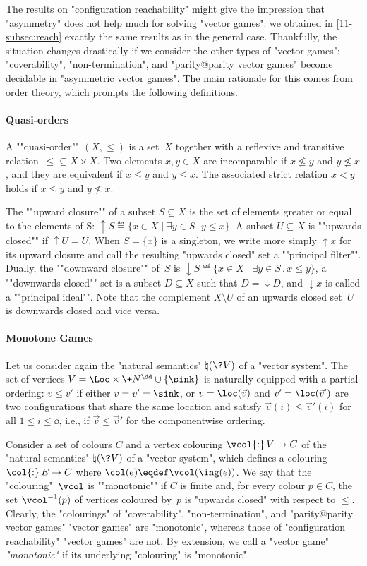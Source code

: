 
The results on "configuration reachability" might give the impression
that "asymmetry" does not help much for solving "vector games": we
obtained in \cref{11-subsec:reach} exactly the same results as in the
general case.  Thankfully, the situation changes drastically if we
consider the other types of "vector games": "coverability",
"non-termination", and "parity@parity vector games" become decidable
in "asymmetric vector games".  The main rationale for this comes from
order theory, which prompts the following definitions.

\paragraph{Quasi-orders}\AP A ""quasi-order"" $(X,{\leq})$ is a
set~$X$ together with a reflexive and transitive
relation~${\leq}\subseteq X\times X$.  Two elements $x,y\in X$ are
incomparable if $x\not\leq y$ and $y\not\leq x$, and they are
equivalent if $x\leq y$ and $y\leq x$.  The associated strict relation
$x<y$ holds if $x\leq y$ and $y\not\leq x$.

The ""upward closure"" of a subset $S\subseteq X$ is the set of
elements greater or equal to the elements of S:
${\uparrow}S\eqdef\{x\in X\mid\exists y\in S\mathbin.y\leq x\}$.  A
subset $U\subseteq X$ is ""upwards closed"" if ${\uparrow}U=U$.  When
$S=\{x\}$ is a singleton, we write more simply ${\uparrow}x$ for its
upward closure and call the resulting "upwards closed" set a
""principal filter"".  Dually, the ""downward closure"" of~$S$ is
${\downarrow}S\eqdef\{x\in X\mid\exists y\in S\mathbin.x\leq y\}$, a
""downwards closed"" set is a subset $D\subseteq X$ such that
$D={\downarrow}D$, and ${\downarrow}x$ is called a ""principal
ideal"".  Note that the complement $X\setminus U$ of an upwards closed
set~$U$ is downwards closed and vice versa.


\paragraph{Monotone Games}\AP
Let us consider again the "natural semantics" $\natural(\?V)$ of a
"vector system".  The set of vertices
$V=\Loc\times\+N^\dd\cup\{\sink\}$ is naturally equipped with a
partial ordering: $v\leq v'$ if either $v=v'=\sink$, or $v=\loc(\vec
v)$ and $v'=\loc(\vec v')$ are two configurations that share the same
location and satisfy $\vec v(i)\leq\vec v'(i)$ for all $1\leq
i\leq\dd$, i.e., if $\vec v\leq\vec v'$ for the componentwise
ordering.

Consider a set of colours $C$ and a vertex colouring $\vcol{:}\,V\to C$
of the "natural semantics" $\natural(\?V)$ of a "vector system", which
defines a colouring $\col{:}\,E\to C$ where
$\col(e)\eqdef\vcol(\ing(e))$.  We
say that the "colouring"~$\vcol$ is ""monotonic"" if $C$ is finite and,
for every colour $p\in C$, the set $\vcol^{-1}(p)$ of vertices coloured
by~$p$ is "upwards closed" with respect to ${\leq}$.  Clearly, the
"colourings" of "coverability", "non-termination", and "parity@parity
vector games" "vector games" are "monotonic", whereas those of
"configuration reachability" "vector games" are not.  By extension, we
call a "vector game" \emph{"monotonic"} if its underlying "colouring"
is "monotonic".

